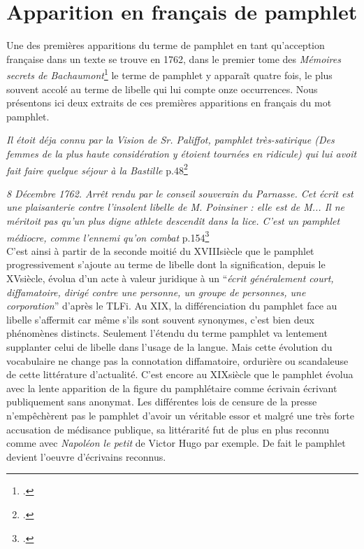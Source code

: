 \section{Apparition en français de pamphlet}
Une des premières apparitions du terme de pamphlet en tant qu'acception française dans un texte se trouve en 1762, dans le premier tome des \textit{Mémoires secrets de Bachaumont}\footcites{bachaumont_memoires_1783} le terme de pamphlet y apparaît quatre fois, le plus souvent accolé au terme de libelle qui lui compte onze occurrences. Nous présentons ici deux extraits de ces premières apparitions en français du mot pamphlet.\\\par
\textit{Il étoit déja connu par la Vision de Sr. Paliffot, pamphlet très-satirique (Des femmes de la plus haute considération y étoient tournées en ridicule) qui lui avoit fait faire quelque séjour à la Bastille} p.48\footcites{bachaumont_memoires_1783}\\\par

\textit{8 Décembre 1762. Arrêt rendu par le conseil souverain du Parnasse. Cet écrit est une plaisanterie contre l'insolent libelle de M. Poinsiner : elle est de M... Il ne méritoit pas qu'un plus digne athlete descendît dans la lice. C'est un pamphlet médiocre, comme l'ennemi qu'on combat} p.154\footcites{bachaumont_memoires_1783}\\

C'est ainsi à partir de la seconde moitié du XVIII\ieme siècle que le pamphlet progressivement s'ajoute au terme de libelle dont la signification, depuis le XV\ieme siècle, évolua d'un acte à valeur juridique à un \enquote{\textit{écrit généralement court, diffamatoire, dirigé contre une personne, un groupe de personnes, une corporation}} d'après le TLFi. Au XIX\ieme, la différenciation du pamphlet face au libelle s'affermit car même s'ils sont souvent synonymes, c'est bien deux phénomènes distincts. Seulement l'étendu du terme pamphlet va lentement supplanter celui de libelle dans l'usage de la langue. Mais cette évolution du vocabulaire ne change pas la connotation diffamatoire, ordurière ou scandaleuse de cette littérature d'actualité. C'est encore au XIX\ieme siècle que le pamphlet évolua avec la lente apparition de la figure du pamphlétaire comme écrivain écrivant publiquement sans anonymat. Les différentes lois de censure de la presse n'empêchèrent pas le pamphlet d'avoir un véritable essor et malgré une très forte accusation de médisance publique, sa littérarité fut de plus en plus reconnu comme avec \textit{Napoléon le petit} de Victor Hugo par exemple. De fait le pamphlet devient l'oeuvre d'écrivains reconnus.

